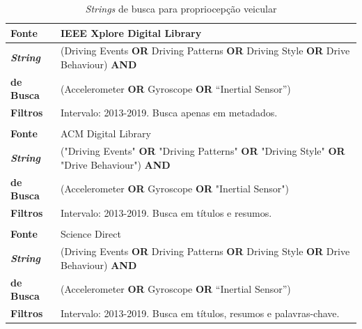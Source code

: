 \begin{table}[h!]
    \caption{\textit{Strings} de busca para propriocepção veicular}
    \label{tabela:propriocepcao_busca}
    \centering
    \small
    \begin{tabular}{l l}
        
        \toprule
        \textbf{Fonte} & IEEE Xplore Digital Library \\
        \toprule
        \textbf{\textit{String}} & (Driving Events \textbf{OR} Driving Patterns \textbf{OR} Driving Style \textbf{OR} Drive Behaviour) \textbf{AND} \\ \textbf{de Busca} & (Accelerometer \textbf{OR} Gyroscope \textbf{OR} “Inertial Sensor”) \\
        \toprule
        \textbf{Filtros} & Intervalo: 2013-2019. Busca apenas em metadados. \\
        \bottomrule
        
        \\
        
        \toprule
        \textbf{Fonte} & ACM Digital Library \\
        \toprule
        \textbf{\textit{String}} & ("Driving Events" \textbf{OR} "Driving Patterns" \textbf{OR} "Driving Style" \textbf{OR} "Drive Behaviour")  \textbf{AND}  \\ \textbf{de Busca} & (Accelerometer \textbf{OR} Gyroscope \textbf{OR} "Inertial Sensor") \\
        \toprule
        \textbf{Filtros} & Intervalo: 2013-2019.  Busca em títulos e resumos. \\
        \bottomrule
         
         \\
         
        \toprule
        \textbf{Fonte} & Science Direct \\
        \toprule
        \textbf{\textit{String}} & (Driving Events \textbf{OR} Driving Patterns \textbf{OR} Driving Style \textbf{OR}  Drive Behaviour) \textbf{AND} \\ \textbf{de Busca} & (Accelerometer \textbf{OR} Gyroscope \textbf{OR} “Inertial Sensor”) \\
        \toprule
        \textbf{Filtros} & Intervalo: 2013-2019. Busca em títulos, resumos e palavras-chave. \\
        \bottomrule
        
    \end{tabular}
\end{table}

